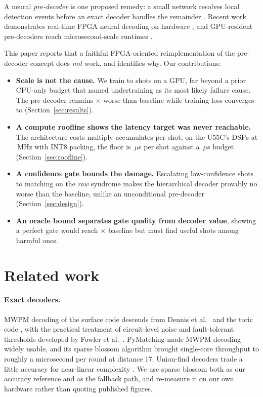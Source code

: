 \documentclass[pdflatex,sn-mathphys-num]{sn-jnl}
\begin{document}
A neural \emph{pre-decoder} is one proposed remedy: a small network resolves
local detection events before an exact decoder handles the remainder
\cite{chamberland2026fast, alavisamani2024promatch}. Recent work demonstrates
real-time FPGA neural decoding on hardware \cite{yang2026realtime}, and
GPU-resident pre-decoders reach microsecond-scale runtimes
\cite{chamberland2026fast}.

This paper reports that a faithful FPGA-oriented reimplementation of the
pre-decoder concept does \emph{not} work, and identifies why. Our contributions:

\begin{itemize}
\item \textbf{Scale is not the cause.} We train to \trainShots{} shots on a GPU,
far beyond a prior CPU-only budget that named undertraining as its most likely
failure cause. The pre-decoder remains \hierPreOnlyRatio$\times$ worse than
baseline while training loss converges to \trainFinalLoss{}
(Section~\ref{sec:results}).
\item \textbf{A compute roofline shows the latency target was never reachable.}
The architecture costs \archMACs{} multiply-accumulates per shot; on the U55C's
\devDSP{} DSPs at \rooflineClock\,MHz with INT8 packing, the floor is
\rooflineIntEightLatency\,$\mu$s per shot against a \roundBudget\,$\mu$s budget
(Section~\ref{sec:roofline}).
\item \textbf{A confidence gate bounds the damage.} Escalating low-confidence
shots to matching on the \emph{raw} syndrome makes the hierarchical decoder
provably no worse than the baseline, unlike an unconditional pre-decoder
(Section~\ref{sec:design}).
\item \textbf{An oracle bound separates gate quality from decoder value},
showing a perfect gate would reach \hierOracleRatio$\times$ baseline but must
find \hierSaves{} useful shots among \hierBreaks{} harmful ones.
\end{itemize}

\section{Related work}\label{sec:related}

\paragraph{Exact decoders.} MWPM decoding of the surface code descends from
Dennis et al.\ \cite{dennis2002topological} and the toric code
\cite{kitaev2003fault}, with the practical treatment of circuit-level noise and
fault-tolerant thresholds developed by Fowler et al.\ \cite{fowler2012surface}.
PyMatching \cite{higgott2022pymatching} made MWPM decoding widely usable, and its
sparse blossom algorithm \cite{higgott2025sparseblossom} brought single-core
throughput to roughly a microsecond per round at distance 17. Union-find
decoders trade a little accuracy for near-linear complexity
\cite{delfosse2021almost}. We use sparse blossom both as our accuracy reference
and as the fallback path, and re-measure it on our own hardware rather than
quoting published figures.
\end{document}
